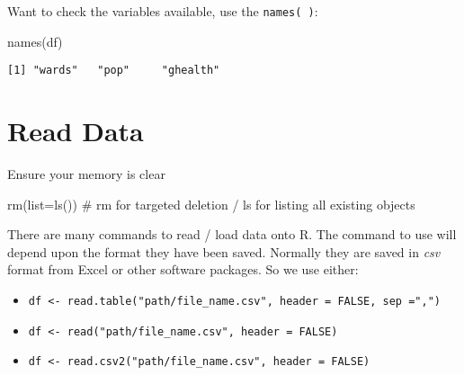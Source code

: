 \documentclass[
  letterpaper,
  krantz2]{style/krantz}
\newenvironment{Shaded}{\begin{snugshade}}{\end{snugshade}}
\newcommand{\AttributeTok}[1]{\textcolor[rgb]{0.40,0.45,0.13}{#1}}
\newcommand{\CommentTok}[1]{\textcolor[rgb]{0.37,0.37,0.37}{#1}}
\newcommand{\FunctionTok}[1]{\textcolor[rgb]{0.28,0.35,0.67}{#1}}
\newcommand{\NormalTok}[1]{\textcolor[rgb]{0.00,0.23,0.31}{#1}}
\newcommand{\SpecialCharTok}[1]{\textcolor[rgb]{0.37,0.37,0.37}{#1}}
\newcommand{\StringTok}[1]{\textcolor[rgb]{0.13,0.47,0.30}{#1}}
\providecommand{\tightlist}{%
  \setlength{\itemsep}{0pt}\setlength{\parskip}{0pt}}\usepackage{longtable,booktabs,array}
\begin{document}
\begin{Shaded}
\end{Shaded}

Want to check the variables available, use the \texttt{names(\ )}:

\begin{Shaded}
\begin{Highlighting}[]
\FunctionTok{names}\NormalTok{(df)}
\end{Highlighting}
\end{Shaded}

\begin{verbatim}
[1] "wards"   "pop"     "ghealth"
\end{verbatim}

\hypertarget{sec_readdata}{%
\section{Read Data}\label{sec_readdata}}

Ensure your memory is clear

\begin{Shaded}
\begin{Highlighting}[]
\FunctionTok{rm}\NormalTok{(}\AttributeTok{list=}\FunctionTok{ls}\NormalTok{()) }\CommentTok{\# rm for targeted deletion / ls for listing all existing objects}
\end{Highlighting}
\end{Shaded}

There are many commands to read / load data onto R. The command to use
will depend upon the format they have been saved. Normally they are
saved in \emph{csv} format from Excel or other software packages. So we
use either:

\begin{itemize}
\tightlist
\item
  \texttt{df\ \textless{}-\ read.table("path/file\_name.csv",\ header\ =\ FALSE,\ sep\ =",")}
\item
  \texttt{df\ \textless{}-\ read("path/file\_name.csv",\ header\ =\ FALSE)}
\item
  \texttt{df\ \textless{}-\ read.csv2("path/file\_name.csv",\ header\ =\ FALSE)}
\end{itemize}
\end{document}
